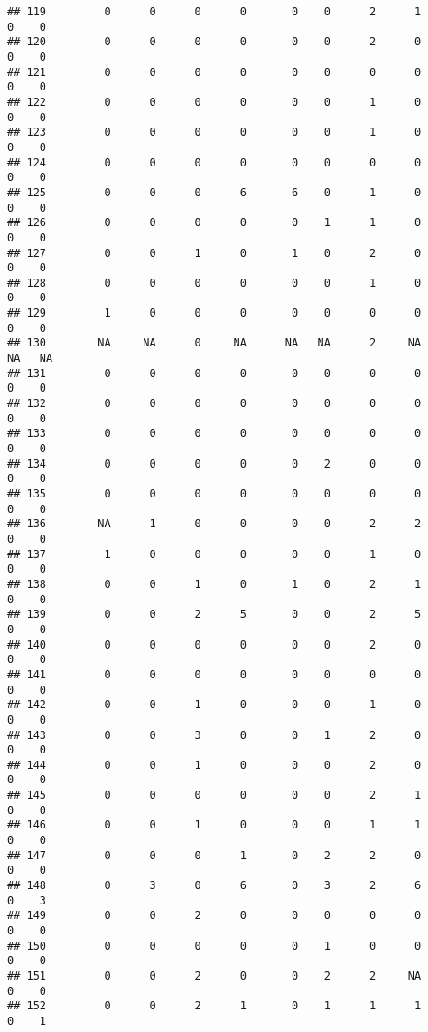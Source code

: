 \documentclass[
]{article}
\begin{document}
\begin{verbatim}
## 119         0      0      0      0       0    0      2      1       0    0
## 120         0      0      0      0       0    0      2      0       0    0
## 121         0      0      0      0       0    0      0      0       0    0
## 122         0      0      0      0       0    0      1      0       0    0
## 123         0      0      0      0       0    0      1      0       0    0
## 124         0      0      0      0       0    0      0      0       0    0
## 125         0      0      0      6       6    0      1      0       0    0
## 126         0      0      0      0       0    1      1      0       0    0
## 127         0      0      1      0       1    0      2      0       0    0
## 128         0      0      0      0       0    0      1      0       0    0
## 129         1      0      0      0       0    0      0      0       0    0
## 130        NA     NA      0     NA      NA   NA      2     NA      NA   NA
## 131         0      0      0      0       0    0      0      0       0    0
## 132         0      0      0      0       0    0      0      0       0    0
## 133         0      0      0      0       0    0      0      0       0    0
## 134         0      0      0      0       0    2      0      0       0    0
## 135         0      0      0      0       0    0      0      0       0    0
## 136        NA      1      0      0       0    0      2      2       0    0
## 137         1      0      0      0       0    0      1      0       0    0
## 138         0      0      1      0       1    0      2      1       0    0
## 139         0      0      2      5       0    0      2      5       0    0
## 140         0      0      0      0       0    0      2      0       0    0
## 141         0      0      0      0       0    0      0      0       0    0
## 142         0      0      1      0       0    0      1      0       0    0
## 143         0      0      3      0       0    1      2      0       0    0
## 144         0      0      1      0       0    0      2      0       0    0
## 145         0      0      0      0       0    0      2      1       0    0
## 146         0      0      1      0       0    0      1      1       0    0
## 147         0      0      0      1       0    2      2      0       0    0
## 148         0      3      0      6       0    3      2      6       0    3
## 149         0      0      2      0       0    0      0      0       0    0
## 150         0      0      0      0       0    1      0      0       0    0
## 151         0      0      2      0       0    2      2     NA       0    0
## 152         0      0      2      1       0    1      1      1       0    1

\end{verbatim}
\end{document}
